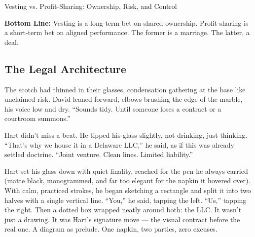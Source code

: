 \begin{HistoricalSidebar}{Vesting vs. Profit-Sharing: Ownership, Risk, and Control}
    \medskip
    
    \textbf{Bottom Line:}  
    Vesting is a long-term bet on shared ownership.  
    Profit-sharing is a short-term bet on aligned performance.  
    The former is a marriage. The latter, a deal.
    
\end{HistoricalSidebar}




\subsection{The Legal Architecture}

The scotch had thinned in their glasses, condensation gathering at the base like unclaimed risk. David leaned forward, 
elbows brushing the edge of the marble, his voice low and dry. ``Sounds tidy. Until someone loses a contract or a 
courtroom summons.''

Hart didn’t miss a beat. He tipped his glass slightly, not drinking, just thinking. ``That’s why we house it in a 
Delaware LLC,'' he said, as if this was already settled doctrine. ``Joint venture. Clean lines. Limited liability.''

Hart set his glass down with quiet finality, reached for the pen he always carried (matte black, monogrammed, and far 
too elegant for the napkin it hovered over). With calm, practiced strokes, he began sketching a rectangle and split it 
into two halves with a single vertical line. “You,” he said, tapping the left. “Us,” tapping the right. Then a dotted 
box wrapped neatly around both: the LLC. It wasn’t just a drawing. It was Hart’s signature move — the visual contract 
before the real one. A diagram as prelude. One napkin, two parties, zero excuses.


\medskip

